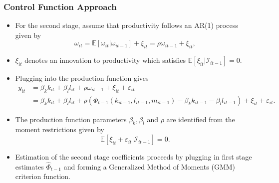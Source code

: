 \documentclass[xcolor={dvipsnames}, notheorems]{beamer}
\theoremstyle{plain}
\begin{document}

\begin{frame}
\frametitle{Control Function Approach}
\begin{itemize}
\item For the second stage, assume that productivity follows an AR(1) process given by
\begin{equation}
\omega_{it}=\mathbb{E}[\omega_{it}|\omega_{it-1}]+\xi_{it}=\rho\omega_{it-1}+\xi_{it},
\end{equation}
\item $\xi_{it}$ denotes an innovation to productivity which satisfies $\mathbb{E}[\xi_{it}|\mathcal{I}_{it-1}]=0$.
\item Plugging into the production function gives
\begin{equation*}
\begin{split}
y_{it}&=\beta_{k}k_{it}+\beta_{l}l_{it}+\rho\omega_{it-1}+\xi_{it}+\varepsilon_{it}\\
&=\beta_{k}k_{it}+\beta_{l}l_{it}+\rho(\Phi_{t-1}(k_{it-1}, l_{it-1}, m_{it-1})-\beta_{k}k_{it-1}-\beta_{l}l_{it-1})+\xi_{it}+\varepsilon_{it}.
\end{split}
\end{equation*}
\item The production function parameters $\beta_{k}, \beta_{l}$ and $\rho$ are identified from the moment restrictions given by
\begin{equation}\label{2ndstagemoment}
\mathbb{E}[\xi_{it}+\varepsilon_{it}|\mathcal{I}_{it-1}]=0.
\end{equation}
\item Estimation of the second stage coefficients proceeds by plugging in first stage estimates $\hat{\Phi}_{t-1}$ and forming a Generalized Method of Moments (GMM) criterion function.
\end{itemize}
\end{frame}

\end{document}
